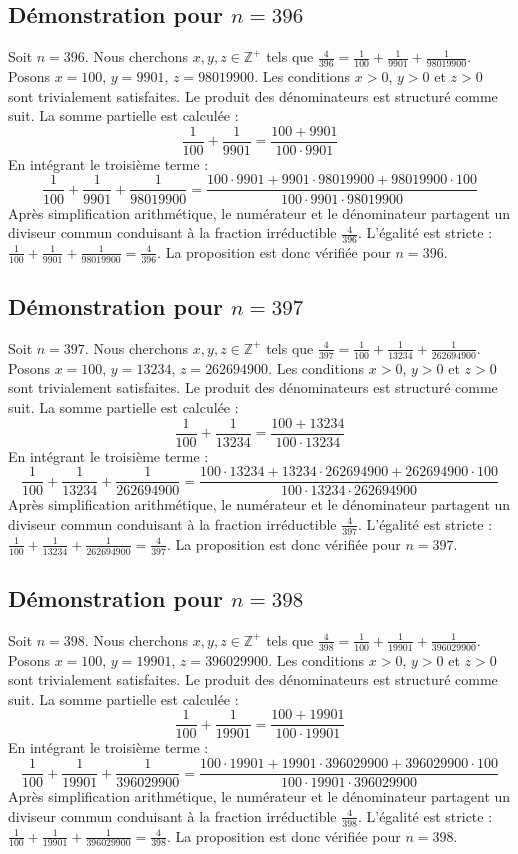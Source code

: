 \documentclass[11pt,a4paper]{article}
\begin{document}
\subsection{Démonstration pour $n = 396$}
Soit $n = 396$. Nous cherchons $x, y, z \in \mathbb{Z}^{+}$ tels que $\frac{4}{396} = \frac{1}{100} + \frac{1}{9901} + \frac{1}{98019900}$.
Posons $x = 100$, $y = 9901$, $z = 98019900$.
Les conditions $x > 0$, $y > 0$ et $z > 0$ sont trivialement satisfaites.
Le produit des dénominateurs est structuré comme suit. La somme partielle est calculée :
$$ \frac{1}{100} + \frac{1}{9901} = \frac{100+9901}{100 \cdot 9901} $$
En intégrant le troisième terme :
$$ \frac{1}{100} + \frac{1}{9901} + \frac{1}{98019900} = \frac{100 \cdot 9901 + 9901 \cdot 98019900 + 98019900 \cdot 100}{100 \cdot 9901 \cdot 98019900} $$
Après simplification arithmétique, le numérateur et le dénominateur partagent un diviseur commun conduisant à la fraction irréductible $\frac{4}{396}$.
L'égalité est stricte : $\frac{1}{100} + \frac{1}{9901} + \frac{1}{98019900} = \frac{4}{396}$.
La proposition est donc vérifiée pour $n = 396$.
\subsection{Démonstration pour $n = 397$}
Soit $n = 397$. Nous cherchons $x, y, z \in \mathbb{Z}^{+}$ tels que $\frac{4}{397} = \frac{1}{100} + \frac{1}{13234} + \frac{1}{262694900}$.
Posons $x = 100$, $y = 13234$, $z = 262694900$.
Les conditions $x > 0$, $y > 0$ et $z > 0$ sont trivialement satisfaites.
Le produit des dénominateurs est structuré comme suit. La somme partielle est calculée :
$$ \frac{1}{100} + \frac{1}{13234} = \frac{100+13234}{100 \cdot 13234} $$
En intégrant le troisième terme :
$$ \frac{1}{100} + \frac{1}{13234} + \frac{1}{262694900} = \frac{100 \cdot 13234 + 13234 \cdot 262694900 + 262694900 \cdot 100}{100 \cdot 13234 \cdot 262694900} $$
Après simplification arithmétique, le numérateur et le dénominateur partagent un diviseur commun conduisant à la fraction irréductible $\frac{4}{397}$.
L'égalité est stricte : $\frac{1}{100} + \frac{1}{13234} + \frac{1}{262694900} = \frac{4}{397}$.
La proposition est donc vérifiée pour $n = 397$.
\subsection{Démonstration pour $n = 398$}
Soit $n = 398$. Nous cherchons $x, y, z \in \mathbb{Z}^{+}$ tels que $\frac{4}{398} = \frac{1}{100} + \frac{1}{19901} + \frac{1}{396029900}$.
Posons $x = 100$, $y = 19901$, $z = 396029900$.
Les conditions $x > 0$, $y > 0$ et $z > 0$ sont trivialement satisfaites.
Le produit des dénominateurs est structuré comme suit. La somme partielle est calculée :
$$ \frac{1}{100} + \frac{1}{19901} = \frac{100+19901}{100 \cdot 19901} $$
En intégrant le troisième terme :
$$ \frac{1}{100} + \frac{1}{19901} + \frac{1}{396029900} = \frac{100 \cdot 19901 + 19901 \cdot 396029900 + 396029900 \cdot 100}{100 \cdot 19901 \cdot 396029900} $$
Après simplification arithmétique, le numérateur et le dénominateur partagent un diviseur commun conduisant à la fraction irréductible $\frac{4}{398}$.
L'égalité est stricte : $\frac{1}{100} + \frac{1}{19901} + \frac{1}{396029900} = \frac{4}{398}$.
La proposition est donc vérifiée pour $n = 398$.
\end{document}
